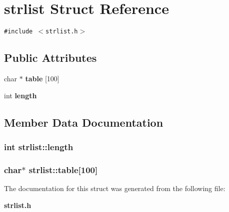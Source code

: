 \section{strlist Struct Reference}
\label{structstrlist}
{\tt \#include $<$strlist.h$>$}

\subsection*{Public Attributes}
\begin{CompactItemize}
\item 
char $\ast$ {\bf table} [100]
\item 
int {\bf length}
\end{CompactItemize}


\subsection{Member Data Documentation}
\subsubsection{\setlength{\rightskip}{0pt plus 5cm}int {\bf strlist::length}}\label{structstrlist_o1}


\subsubsection{\setlength{\rightskip}{0pt plus 5cm}char$\ast$ {\bf strlist::table}[100]}\label{structstrlist_o0}




The documentation for this struct was generated from the following file:\begin{CompactItemize}
\item 
{\bf strlist.h}\end{CompactItemize}
